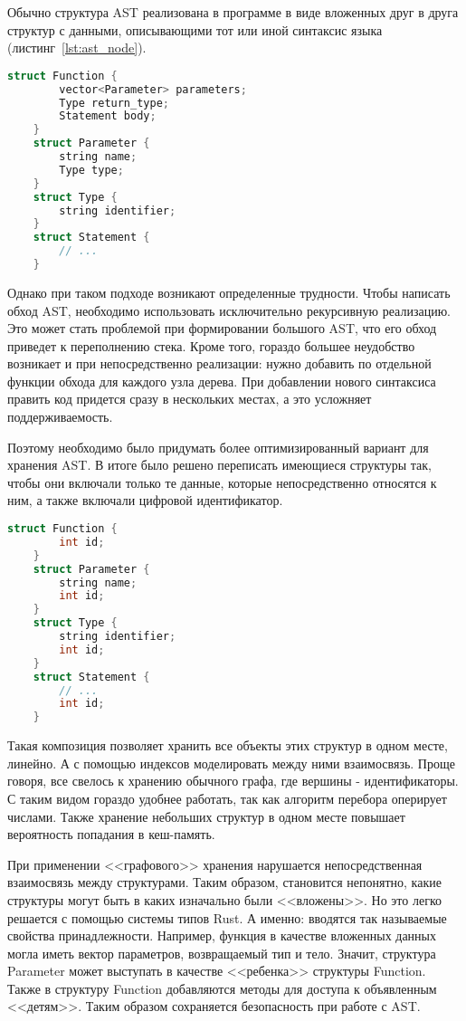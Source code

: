 Обычно структура AST реализована в программе в виде вложенных друг в друга структур с данными, описывающими тот или иной синтаксис языка (листинг~\ref{lst:ast_node}).

\begin{lstlisting}[language=C, label=lst:ast_node, caption={Псевдокод структур, представляющей собой описание синтаксиса функции в языке программирования.}]
    struct Function {
        vector<Parameter> parameters;
        Type return_type;
        Statement body;
    }
    struct Parameter {
        string name;
        Type type;
    }
    struct Type {
        string identifier;
    }
    struct Statement {
        // ...
    }
\end{lstlisting}

Однако при таком подходе возникают определенные трудности.
Чтобы написать обход AST, необходимо использовать исключительно рекурсивную реализацию.
Это может стать проблемой при формировании большого AST, что его обход приведет к переполнению стека.
Кроме того, гораздо большее неудобство возникает и при непосредственно реализации: нужно добавить по отдельной функции обхода для каждого узла дерева.
При добавлении нового синтаксиса править код придется сразу в нескольких местах, а это усложняет поддерживаемость.

Поэтому необходимо было придумать более оптимизированный вариант для хранения AST.
В итоге было решено переписать имеющиеся структуры так, чтобы они включали только те данные, которые непосредственно относятся к ним, а также включали цифровой идентификатор.

\begin{lstlisting}[language=C, label=lst:ast_node_after, caption={Псевдокод структур после преобразования.}]
    struct Function {
        int id;
    }
    struct Parameter {
        string name;
        int id;
    }
    struct Type {
        string identifier;
        int id;
    }
    struct Statement {
        // ...
        int id;
    }
\end{lstlisting}

Такая композиция позволяет хранить все объекты этих структур в одном месте, линейно.
А с помощью индексов моделировать между ними взаимосвязь.
Проще говоря, все свелось к хранению обычного графа, где вершины - идентификаторы.
С таким видом гораздо удобнее работать, так как алгоритм перебора оперирует числами.
Также хранение небольших структур в одном месте повышает вероятность попадания в кеш-память.

При применении <<графового>> хранения нарушается непосредственная взаимосвязь между структурами.
Таким образом, становится непонятно, какие структуры могут быть в каких изначально были <<вложены>>.
Но это легко решается с помощью системы типов Rust.
А именно: вводятся так называемые свойства принадлежности.
Например, функция в качестве вложенных данных могла иметь вектор параметров, возвращаемый тип и тело.
Значит, структура Parameter может выступать в качестве <<ребенка>> структуры Function.
Также в структуру Function добавляются методы для доступа к объявленным <<детям>>.
Таким образом сохраняется безопасность при работе с AST.

